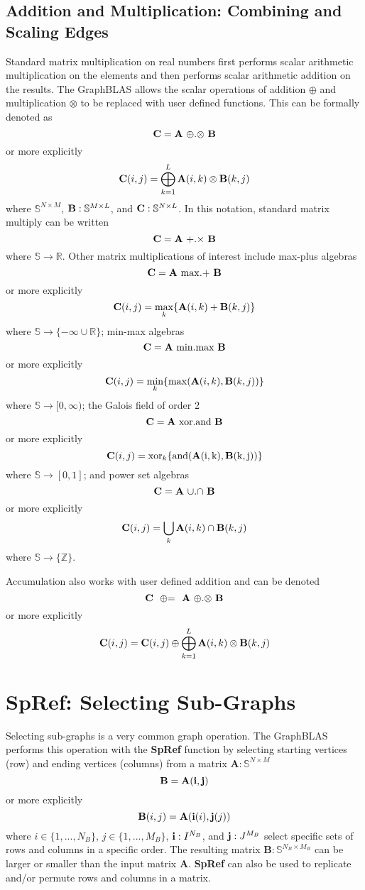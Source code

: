 \subsection{Addition and Multiplication: Combining and Scaling Edges}
  Standard matrix multiplication on real numbers first performs scalar arithmetic multiplication on the elements and then performs scalar arithmetic addition on the results.  The GraphBLAS allows the scalar operations of addition $\oplus$ and multiplication $\otimes$ to be replaced with user defined functions.  This can be formally denoted as
$$
   {\bf C} = {\bf A} ~ {\oplus}.{\otimes} ~ {\bf B}
$$
or more explicitly
$$
   {\bf C}(i,j) = \bigoplus_{k=1}^L {\bf A}(i,k) \otimes {\bf B}(k,j)
$$
where $\mathbb{S}^{N \times M}$,  ${\bf B}: \mathbb{S}^{M \times L}$, and ${\bf C}: \mathbb{S}^{N \times L}$.  In this notation, standard matrix multiply can be written
$$
   {\bf C} = {\bf A} ~ {+}.{\times} ~ {\bf B}
$$
where $\mathbb{S} \rightarrow \mathbb{R}$. Other matrix multiplications of interest include max-plus algebras
$$
   {\bf C} = {\bf A} ~ {\max}.{+} ~ {\bf B}
$$
or more explicitly
$$
   {\bf C}(i,j) = \max_k \{{\bf A}(i,k) + {\bf B}(k,j)\}
$$
where $\mathbb{S} \rightarrow \{-\infty \cup \mathbb{R}\}$; min-max algebras
$$
   {\bf C} = {\bf A} ~ {\min}.{\max} ~ {\bf B}
$$
or more explicitly
$$
   {\bf C}(i,j) = \min_k \{\max({\bf A}(i,k),{\bf B}(k,j))\}
$$
where $\mathbb{S} \rightarrow [0,\infty)$; the Galois field of order 2
$$
   {\bf C} = {\bf A} ~ {\rm xor}.{\rm and} ~ {\bf B}
$$
or more explicitly
$$
   {\bf C}(i,j) = {\rm xor}_k \{\rm and({\bf A}(i,k),{\bf B}(k,j))\}
$$
where $\mathbb{S} \rightarrow [0,1]$; and power set algebras
$$
   {\bf C} = {\bf A} ~ {\cup}.{\cap} ~ {\bf B}
$$
or more explicitly
$$
   {\bf C}(i,j) = \bigcup_k {\bf A}(i,k) \cap {\bf B}(k,j)
$$
where $\mathbb{S} \rightarrow \{\mathbb{Z}\}$.

  Accumulation also works with user defined addition and can be denoted
$$
   {\bf C} ~~ {\oplus}{=} ~~ {\bf A} ~ {\oplus}.{\otimes} ~ {\bf B}
$$
or more explicitly
$$
   {\bf C}(i,j) = {\bf C}(i,j) \oplus \bigoplus_{k=1}^L {\bf A}(i,k) \otimes {\bf B}(k,j)
$$


\section{SpRef: Selecting Sub-Graphs}
  Selecting sub-graphs is a very common graph operation.  The GraphBLAS performs this operation with the {\bf SpRef} function by selecting starting vertices (row) and ending vertices (columns) from a matrix $\mathbf{A} : \mathbb{S}^{N \times M}$
$$
   \mathbf{B}= \mathbf{A}({\bf i},{\bf j})
$$
or more explicitly
$$
   {\bf B}(i,j) = {\bf A}({\bf i}(i),{\bf j}(j))
$$
where $i \in \{1,...,N_B\}$, $j \in \{1,...,M_B\}$, ${\bf i} : I^{N_B}$, and ${\bf j}: J^{M_B}$  select specific sets of rows and columns in a specific order.   The resulting matrix $\mathbf{B} : \mathbb{S}^{N_B \times M_B}$ can be larger or smaller than the input matrix $\mathbf{A}$.  {\bf SpRef} can also be used to replicate and/or permute rows and columns in a matrix.

